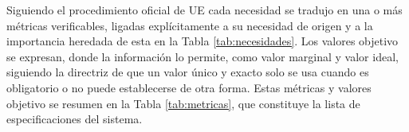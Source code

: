 Siguiendo el procedimiento oficial de UE \cite{Cite11} cada necesidad se 
tradujo en una o más métricas verificables, ligadas explícitamente a su necesidad de origen y a 
la importancia heredada de esta en la Tabla \ref{tab:necesidades}. Los valores objetivo se expresan, donde la información 
lo permite, como valor marginal y valor ideal, siguiendo la 
directriz de que un valor único y exacto solo se usa cuando es obligatorio o no puede establecerse 
de otra forma. Estas métricas y valores objetivo se resumen en la Tabla \ref{tab:metricas}, que 
constituye la lista de especificaciones del sistema.

\newpage

\footnotesize
\setlength{\tabcolsep}{5pt}
